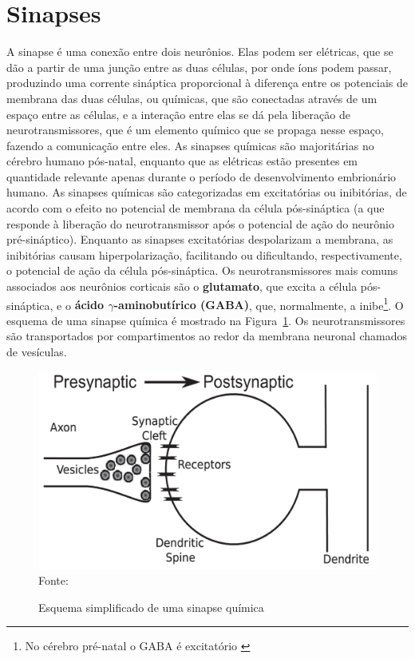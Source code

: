 \section{Sinapses}\label{sec:sinapses}
A sinapse é uma conexão entre dois neurônios. Elas podem ser elétricas, que se dão a partir de uma junção entre as duas células, por onde íons podem passar, produzindo uma corrente sináptica proporcional à diferença entre os potenciais de membrana das duas células, ou químicas, que são conectadas através de um espaço entre as células, e a interação entre elas se dá pela liberação de neurotransmissores, que é um elemento químico que se propaga nesse espaço, fazendo a comunicação entre eles. As sinapses químicas são majoritárias no cérebro humano pós-natal, enquanto que as elétricas estão presentes em quantidade relevante apenas durante o período de desenvolvimento embrionário humano. As sinapses químicas são categorizadas em excitatórias ou inibitórias, de acordo com o efeito no potencial de membrana da célula pós-sináptica (a que responde à liberação do neurotransmissor após o potencial de ação do neurônio pré-sináptico). Enquanto as sinapses excitatórias despolarizam a membrana, as inibitórias causam hiperpolarização, facilitando ou dificultando, respectivamente, o potencial de ação da célula pós-sináptica. Os neurotransmissores mais comuns associados aos neurônios corticais são o \textbf{glutamato}, que excita a célula pós-sináptica, e o \textbf{ácido $\gamma$-aminobutírico (GABA)}, que, normalmente, a inibe\footnote{No cérebro pré-natal o GABA é excitatório \cite{ben-ari_excitatory_2002}}.
O esquema de uma sinapse química é mostrado na Figura~\ref{fig:sinapses}. Os neurotransmissores são transportados por compartimentos ao redor da membrana neuronal chamados de vesículas.
\begin{figure}[tb]
	\centering
	\caption{Esquema simplificado de uma sinapse química}
	\label{fig:sinapses}
	\includegraphics[width=0.7\linewidth]{figs/sinapses}\\
	\small{Fonte: \cite{miller_introductory_2018}}
\end{figure}

